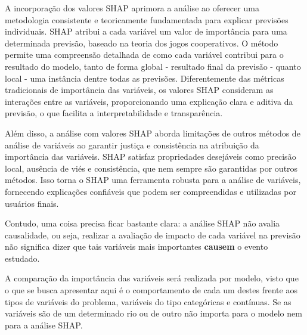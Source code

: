 A incorporação dos valores SHAP aprimora a análise ao oferecer uma metodologia consistente e teoricamente fundamentada para explicar previsões individuais. SHAP atribui a cada variável um valor de importância para uma determinada previsão, baseado na teoria dos jogos cooperativos.\cite{merrick_taly_2020} O método permite uma compreensão detalhada de como cada variável contribui para o resultado do modelo, tanto de forma global - resultado final da previsão - quanto local - uma instância dentre todas as previsões. Diferentemente das métricas tradicionais de importância das variáveis, os valores SHAP consideram as interações entre as variáveis, proporcionando uma explicação clara e aditiva da previsão, o que facilita a interpretabilidade e transparência.

Além disso, a análise com valores SHAP aborda limitações de outros métodos de análise de variáveis ao garantir justiça e consistência na atribuição da importância das variáveis. SHAP satisfaz propriedades desejáveis como precisão local, ausência de viés e consistência, que nem sempre são garantidas por outros métodos. Isso torna o SHAP uma ferramenta robusta para a análise de variáveis, fornecendo explicações confiáveis que podem ser compreendidas e utilizadas por usuários finais.\cite{molnar_2024b}

Contudo, uma coisa precisa ficar bastante clara: a análise SHAP não avalia causalidade, ou seja, realizar a avaliação de impacto de cada variável na previsão não significa dizer que tais variáveis mais importantes \textbf{causem} o evento estudado.

A comparação da importância das variáveis será realizada por modelo, visto que o que se busca apresentar aqui é o comportamento de cada um destes frente aos tipos de variáveis do problema, variáveis do tipo categóricas e contínuas. Se as variáveis são de um determinado rio ou de outro não importa para o modelo nem para a análise SHAP.

